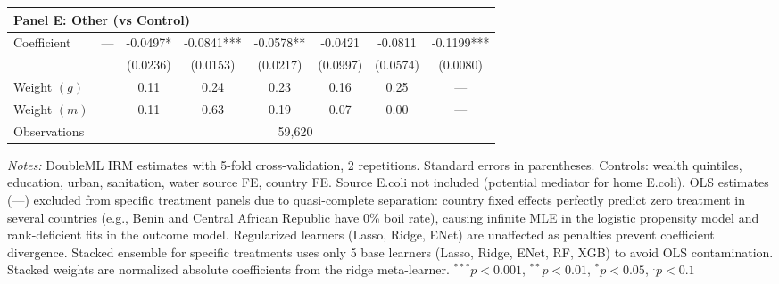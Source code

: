 \begin{table}[htbp]
\begin{tabular}{lccccccc}
\multicolumn{8}{l}{\textbf{Panel E: Other (vs Control)}} \\
\midrule
Coefficient & --- & -0.0497* & -0.0841*** & -0.0578** & -0.0421 & -0.0811 & -0.1199*** \\
 &  & (0.0236) & (0.0153) & (0.0217) & (0.0997) & (0.0574) & (0.0080) \\
Weight $(g)$ &  & 0.11 & 0.24 & 0.23 & 0.16 & 0.25 & — \\
Weight $(m)$ &  & 0.11 & 0.63 & 0.19 & 0.07 & 0.00 & — \\

\midrule
Observations & \multicolumn{7}{c}{59,620} \\
\bottomrule
\end{tabular}
\begin{minipage}{\textwidth}
\footnotesize
\textit{Notes:} DoubleML IRM estimates with 5-fold cross-validation, 2 repetitions. 
Standard errors in parentheses. 
Controls: wealth quintiles, education, urban, sanitation, water source FE, country FE. 
Source E.coli not included (potential mediator for home E.coli). 
OLS estimates (---) excluded from specific treatment panels due to quasi-complete separation: 
country fixed effects perfectly predict zero treatment in several countries (e.g., Benin and Central African Republic have 0\% boil rate), 
causing infinite MLE in the logistic propensity model and rank-deficient fits in the outcome model. 
Regularized learners (Lasso, Ridge, ENet) are unaffected as penalties prevent coefficient divergence. 
Stacked ensemble for specific treatments uses only 5 base learners (Lasso, Ridge, ENet, RF, XGB) to avoid OLS contamination. 
Stacked weights are normalized absolute coefficients from the ridge meta-learner. 
$^{***}p<0.001$, $^{**}p<0.01$, $^{*}p<0.05$, $^{.}p<0.1$
\end{minipage}
\end{table}
